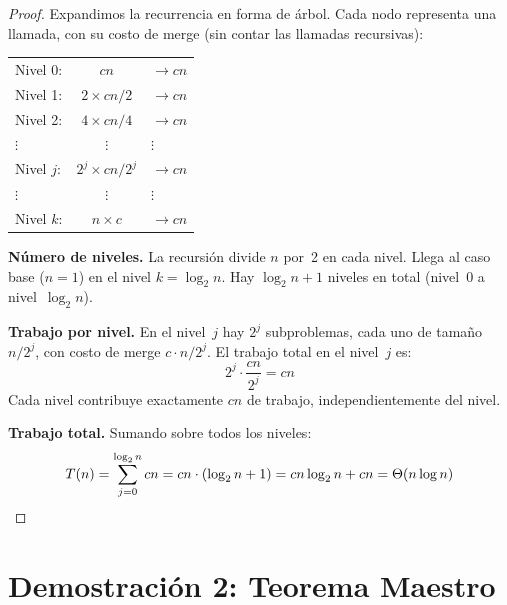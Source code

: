 \documentclass[11pt, letterpaper]{article}
\theoremstyle{definition}
\theoremstyle{plain}
\theoremstyle{remark}
\begin{document}
\begin{proof}
Expandimos la recurrencia en forma de árbol. Cada nodo representa una
llamada, con su costo de merge (sin contar las llamadas recursivas):

\begin{center}
\begin{tabular}{lcl}
Nivel 0: & $cn$ & $\to cn$ \\
Nivel 1: & $2 \times cn/2$ & $\to cn$ \\
Nivel 2: & $4 \times cn/4$ & $\to cn$ \\
$\vdots$ & $\vdots$ & $\vdots$ \\
Nivel $j$: & $2^j \times cn/2^j$ & $\to cn$ \\
$\vdots$ & $\vdots$ & $\vdots$ \\
Nivel $k$: & $n \times c$ & $\to cn$ \\
\end{tabular}
\end{center}

\textbf{Número de niveles.} La recursión divide $n$ por~2 en cada
nivel. Llega al caso base ($n = 1$) en el nivel $k = \log_2 n$. Hay
$\log_2 n + 1$ niveles en total (nivel~0 a nivel~$\log_2 n$).

\textbf{Trabajo por nivel.} En el nivel~$j$ hay $2^j$ subproblemas,
cada uno de tamaño $n/2^j$, con costo de merge $c \cdot n/2^j$. El
trabajo total en el nivel~$j$ es:
\[
  2^j \cdot \frac{cn}{2^j} = cn
\]
Cada nivel contribuye exactamente $cn$ de trabajo, independientemente
del nivel.

\textbf{Trabajo total.} Sumando sobre todos los niveles:
\[
  T(n) = \sum_{j=0}^{\log_2 n} cn
       = cn \cdot (\log_2 n + 1)
       = cn\log_2 n + cn
       = \Theta(n \log n) \qedhere
\]
\end{proof}

\section{Demostración 2: Teorema Maestro}
\end{document}
